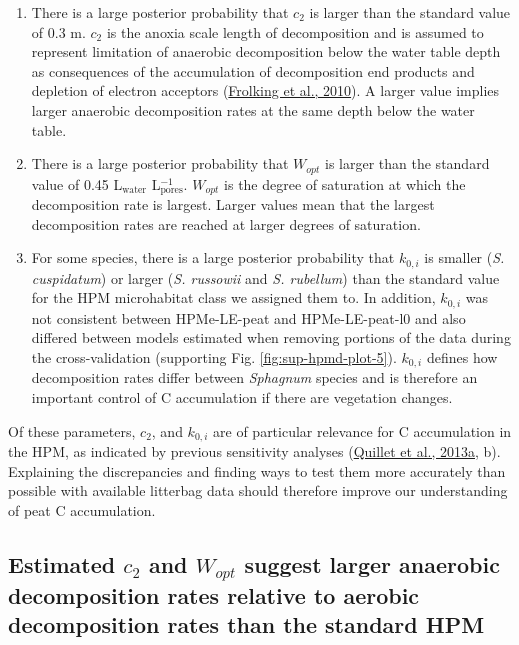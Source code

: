 \documentclass[
  12pt,
]{article}
\begin{document}
\begin{enumerate}
\def\labelenumi{\arabic{enumi}.}
\item
  There is a large posterior probability that \(c_2\) is larger than the standard value of 0.3 m. \(c_2\) is the anoxia scale length of decomposition and is assumed to represent limitation of anaerobic decomposition below the water table depth as consequences of the accumulation of decomposition end products and depletion of electron acceptors (\protect\hyperlink{ref-Frolking.2010}{Frolking et al., 2010}). A larger value implies larger anaerobic decomposition rates at the same depth below the water table.
\item
  There is a large posterior probability that \(W_{opt}\) is larger than the standard value of 0.45 L\(_\text{water}\) L\(_\text{pores}^{-1}\). \(W_{opt}\) is the degree of saturation at which the decomposition rate is largest. Larger values mean that the largest decomposition rates are reached at larger degrees of saturation.
\item
  For some species, there is a large posterior probability that \(k_{0,i}\) is smaller (\emph{S. cuspidatum}) or larger (\emph{S. russowii} and \emph{S. rubellum}) than the standard value for the HPM microhabitat class we assigned them to. In addition, \(k_{0,i}\) was not consistent between HPMe-LE-peat and HPMe-LE-peat-l0 and also differed between models estimated when removing portions of the data during the cross-validation (supporting Fig. \ref{fig:sup-hpmd-plot-5}). \(k_{0,i}\) defines how decomposition rates differ between \emph{Sphagnum} species and is therefore an important control of C accumulation if there are vegetation changes.
\end{enumerate}

Of these parameters, \(c_2\), and \(k_{0,i}\) are of particular relevance for C accumulation in the HPM, as indicated by previous sensitivity analyses (\protect\hyperlink{ref-Quillet.2013}{Quillet et al., 2013a}, b). Explaining the discrepancies and finding ways to test them more accurately than possible with available litterbag data should therefore improve our understanding of peat C accumulation.

\hypertarget{out-discussion-2}{%
\subsection{\texorpdfstring{Estimated \(c_2\) and \(W_{opt}\) suggest larger anaerobic decomposition rates relative to aerobic decomposition rates than the standard HPM}{Estimated c\_2 and W\_\{opt\} suggest larger anaerobic decomposition rates relative to aerobic decomposition rates than the standard HPM}}\label{out-discussion-2}}
\end{document}

